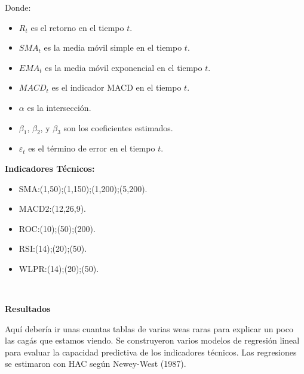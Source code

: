 \documentclass[a0,portrait]{a0poster}
\newcommand{\customsection}[1]{
    \begin{center}
        \begin{tcolorbox}[colframe=miRojo!50, colback=miRojo, width=\linewidth, boxrule=1mm, arc=3mm, auto outer arc]
            \begin{center}
            \vspace{.5cm} %
            \color{white}
            \textbf{\Huge #1}
            \color{miRojo}
            \vspace{.5cm} %
            \end{center}
        \end{tcolorbox}
    \end{center}
}
\begin{document}
\begin{multicols}{2}
    Donde:
    \begin{itemize}
        \item $R_t$ es el retorno en el tiempo $t$.
        \item $SMA_t$ es la media móvil simple en el tiempo $t$.
        \item $EMA_t$ es la media móvil exponencial en el tiempo $t$.
        \item $MACD_t$ es el indicador MACD en el tiempo $t$.
        \item $\alpha$ es la intersección.
        \item $\beta_1$, $\beta_2$, y $\beta_3$ son los coeficientes estimados.
        \item $\varepsilon_t$ es el término de error en el tiempo $t$.
    \end{itemize}
    \par
    \textbf{Indicadores Técnicos:}
    \begin{itemize}
        \item SMA:(1,50);(1,150);(1,200);(5,200).
        \item MACD2:(12,26,9).
        \item ROC:(10);(50);(200).
        \item RSI:(14);(20);(50).
        \item WLPR:(14);(20);(50).
    \end{itemize}
   \ 
    \customsection{Resultados}
    \par  
    
    Aquí debería ir unas cuantas tablas de varias weas raras para explicar un poco las cagás que estamos viendo.
    Se construyeron varios modelos de regresión lineal para evaluar la capacidad predictiva de los indicadores técnicos. Las regresiones se estimaron con HAC según Newey-West (1987).
    


\end{multicols}
\end{document}
